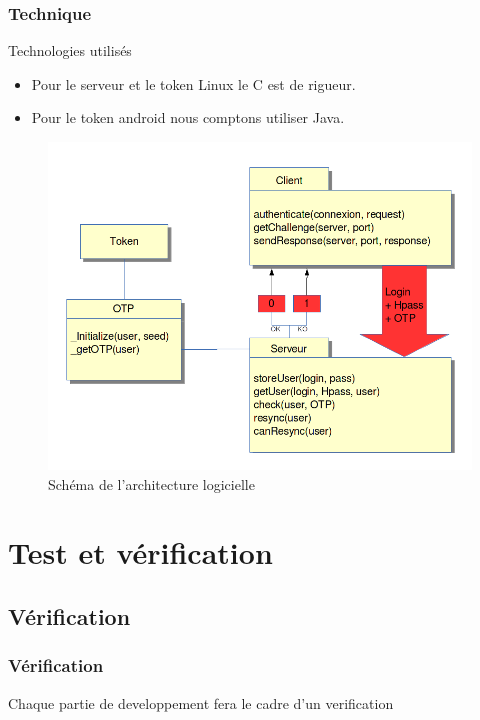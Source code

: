\documentclass{beamer}
\begin{document}
\begin{frame}
\frametitle{Technique}
\begin{block}{Technologies utilisés}
\begin{itemize}
  \item Pour le serveur et le token Linux le C est de rigueur.
  \item Pour le token android nous comptons utiliser Java. 
\end{itemize}
\end{block}

\begin{figure}
 \includegraphics[scale=0.1]{img/architecture.png} %
 \caption{Schéma de l'architecture logicielle}
\end{figure}

\end{frame}


\section{Test et vérification}

\subsection{Vérification}

\begin{frame}
\frametitle{Vérification}
Chaque partie de developpement fera le cadre d'un verification 
\end{frame}
\end{document}
